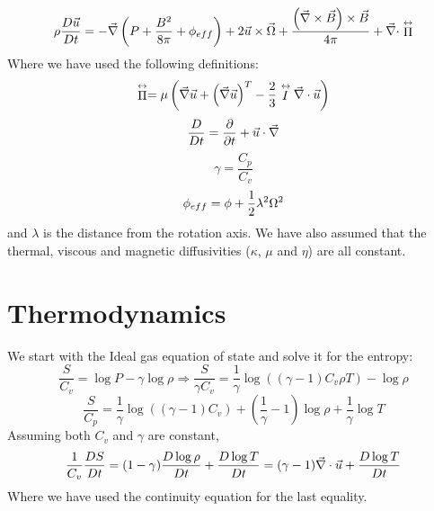 \documentclass[apj,onecolumn]{emulateapj}
\newcommand{\uvec}{\ensuremath{\vec{u}}} %
\newcommand{\Bvec}{\ensuremath{\vec{B}}} %
\begin{document}
\begin{equation}
\rho\DxDt{\uvec} = -\del\left(P + \frac{B^2}{8\pi} + \phi_{eff}\right) +
           2\uvec\times\vec{\Omega} +
           \frac{\left(\del\times\Bvec\right)\times\Bvec}{4\pi} +
           \del\cdot\stackrel{\leftrightarrow}{\Pi}
\end{equation}
Where we have used the following definitions:
\begin{equation}
\stackrel{\leftrightarrow}{\Pi} = \mu\left(\del\uvec +
       \left(\del\uvec\right)^T -
       \frac{2}{3}\stackrel{\leftrightarrow}{I}\del\cdot\uvec\right)
\end{equation}
\begin{equation}
\DDt = \ddt + \uvec\cdot\del
\end{equation}
\begin{equation}
\gamma = \frac{C_p}{C_v}
\end{equation}
\begin{equation}
\phi_{eff} = \phi + \half\lambda^2\Omega^2
\end{equation}
and $\lambda$ is the distance from the rotation axis. We have also assumed 
that the thermal, viscous and magnetic diffusivities ($\kappa$, $\mu$ and 
$\eta$) are all constant.


\section{Thermodynamics}
\label{sec:thermo}
We start with the Ideal gas equation of state and solve it for the entropy:
\begin{equation}
\frac{S}{C_v} = \log P - \gamma \log \rho \Rightarrow
\frac{S}{\gamma C_v} =
         \frac{1}{\gamma}\log\left((\gamma - 1)C_v\rho T\right) - \log\rho
\end{equation}
\begin{equation}
\frac{S}{C_p} = \frac{1}{\gamma}\log\left((\gamma - 1)C_v\right) +
              \left(\frac{1}{\gamma}-1\right)\log\rho +
              \frac{1}{\gamma}\log T
\end{equation}
Assuming both $C_v$ and $\gamma$ are constant,
\begin{equation}
\frac{1}{C_v}\DxDt{S} = (1-\gamma)\DxDt{\log\rho} + \DxDt{\log T} =
 (\gamma -1)\del\cdot\uvec + \DxDt{\log T}
\end{equation}
Where we have used the continuity equation for the last equality.
\end{document}
